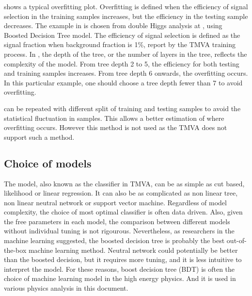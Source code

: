  shows a typical overfitting plot. Overfitting is defined when the efficiency of signal selection in the training samples increases, but the efficiency in the testing sample decreases. The example in   is chosen from double Higgs analysis at , using Boosted Decision Tree model. The efficiency of signal selection is defined as the signal fraction when background fraction is 1\%, report by the TMVA training process. In  , the depth of the tree, or the number of layers in the tree, reflects the complexity of the model. From tree depth 2 to 5, the efficiency for both testing and training samples increases. From tree depth 6 onwards, the overfitting occurs. In this particular example, one should choose a tree depth fewer than 7 to avoid overfitting.

  can be repeated with different split of training and testing samples to avoid the statistical fluctuation in samples. This allows a better estimation of where overfitting occurs. However this method is not used as the TMVA does not support such a method.



\subsection{Choice of models}

The model, also known as the classifier in TMVA, can be as simple as cut based, likelihood or linear regression. It can also be as complicated as non linear tree, non linear neutral network or support vector machine. Regardless of model complexity, the choice of most optimal classifier is often data driven. Also, given the free parameters in each model, the comparison between different models without individual tuning is not rigourous. Nevertheless, as researchers in the machine learning suggested, the boosted decision tree is probably the best out-of-the-box machine learning method. Neutral network could potentially be better than the boosted decision, but it requires more tuning, and it is less intuitive to interpret the model. For these reasons, boost decision tree (BDT) is often the choice of machine learning model in the high energy physics. And it is used in various physics analysis in this document.

